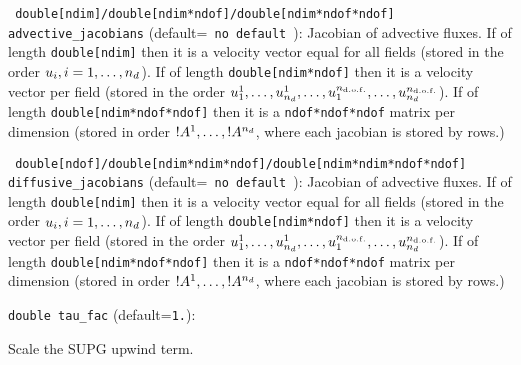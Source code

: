 \item\verb+ double[ndim]/double[ndim*ndof]/double[ndim*ndof*ndof]   advective_jacobians+ {\rm(default=\verb| no default |)}:
 Jacobian of advective fluxes. If of length \verb+double[ndim]+ then it
is a velocity vector equal for all fields (stored in the order $u_i,
i=1,\dots,{n_d}$).  If of length \verb+double[ndim*ndof]+ then it is a
velocity vector per field (stored in the order
$u^1_1,\ldots,u^1_{n_d},\ldots,u^{n_{\mathrm{d.o.f.}}}_1,\ldots,u^{n_{\mathrm{d.o.f.}}}_{n_d}$). If of
length \verb+double[ndim*ndof*ndof]+ then it is a
\verb+ndof*ndof*ndof+ matrix per dimension (stored in order
$!A^1,\ldots,!A^{n_d}$, where each jacobian is stored by rows.)
\item\verb+ double[ndof]/double[ndim*ndim*ndof]/double[ndim*ndim*ndof*ndof]   diffusive_jacobians+ {\rm(default=\verb| no default |)}:
 Jacobian of advective fluxes. If of length \verb+double[ndim]+ then it
is a velocity vector equal for all fields (stored in the order $u_i,
i=1,\dots,{n_d}$).  If of length \verb+double[ndim*ndof]+ then it is a
velocity vector per field (stored in the order
$u^1_1,\ldots,u^1_{n_d},\ldots,u^{n_{\mathrm{d.o.f.}}}_1,\ldots,u^{n_{\mathrm{d.o.f.}}}_{n_d}$). If of
length \verb+double[ndim*ndof*ndof]+ then it is a
\verb+ndof*ndof*ndof+ matrix per dimension (stored in order
$!A^1,\ldots,!A^{n_d}$, where each jacobian is stored by rows.)
\item\verb+double tau_fac+ {\rm(default=\verb|1.|)}:

Scale the SUPG upwind term. 
